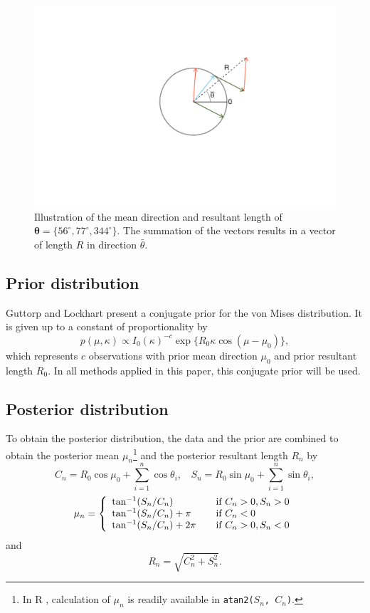 \documentclass[]{gSCS2e}
\theoremstyle{plain}
\theoremstyle{definition}
\theoremstyle{remark}
\begin{document}
\begin{figure}
\centering
\includegraphics[width=0.7\linewidth, clip, trim=4cm 3cm 3cm 2cm]{ExampleRMu.pdf}
\caption{Illustration of the mean direction and resultant length of  $\boldsymbol\theta=\{56^\circ, 77^\circ, 344^\circ\}$. The summation of the vectors results in a vector of length $R$ in direction $\bar{\theta}$.}
\label{exampleRMu}
\end{figure}


\subsection{Prior distribution} \label{prior}

Guttorp and Lockhart \cite{guttorp1988finding} present a conjugate prior for the von Mises distribution. It is given up to a constant of proportionality by 
$$ p(\mu, \kappa) \propto  I_0 (\kappa) ^{-c} \exp\{R_0 \kappa \cos (\mu - \mu_0)\}  ,$$
which represents $c$ observations with prior mean direction $\mu_0$ and prior resultant length $R_0$. In all methods applied in this paper, this conjugate prior will be used. 

\subsection{Posterior distribution} \label{posterior}
To obtain the posterior distribution, the data and the prior are combined to obtain the posterior mean $\mu_n$\footnote{In  R \citep{team2013r}, calculation of $\mu_n$ is readily available in \texttt{atan2($S_n$, $C_n$)}.} and the posterior resultant length $R_n$ by
$$ C_n = R_0 \cos \mu_0 + \sum_{i=1}^n \cos \theta_i, ~~~~ S_n = R_0 \sin \mu_0 + \sum_{i=1}^n \sin \theta_i,$$
$$  \mu_n = \left\{ 
  \begin{array}{l l}
   \tan^{-1} (S_n/C_n)        & \quad \textnormal{if}~ \text{$C_n > 0, S_n > 0$}\\
   \tan^{-1} (S_n/C_n) + \pi  & \quad \textnormal{if}~ \text{$C_n < 0$}\\ 
   \tan^{-1} (S_n/C_n) + 2\pi & \quad \textnormal{if}~ \text{$C_n > 0, S_n < 0$}
  \end{array} \right.$$
and
$$ R_n = \sqrt{C_n^2 + S_n^2}.$$
\end{document}
